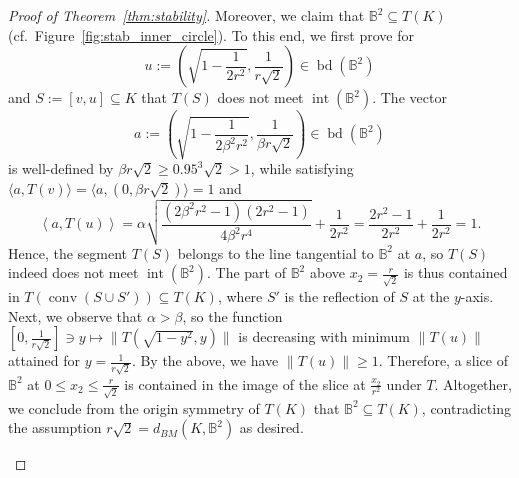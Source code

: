 \documentclass[12pt,a4paper]{article}
\theoremstyle{definition}
\DeclareMathOperator{\conv}{conv}
\DeclareMathOperator{\bd}{bd}
\DeclareMathOperator{\inte}{int}
\newcommand\B{\mathbb{B}}
\begin{document}
\begin{proof}[Proof of Theorem~\ref{thm:stability}]
Moreover, we claim that $\B^2 \subseteq T(K)$ (cf.~Figure~\ref{fig:stab_inner_circle}). To this end, we first prove for
$$ u := \left( \sqrt{1 - \frac{1}{2 r^2}}, \frac{1}{r \sqrt{2}} \right) \in \bd(\B^2) $$
and $S := [v,u] \subseteq K$ that $T(S)$ does not meet $\inte(\B^2)$. The vector
$$ a := \left( \sqrt{1 - \frac{1}{2 \beta^2 r^2}}, \frac{1}{\beta r \sqrt{2}} \right) \in \bd(\B^2) $$
is well-defined by $\beta r \sqrt{2} \geq 0.95^3 \sqrt{2} > 1$, while satisfying $\langle a, T(v) \rangle = \langle a, (0,\beta r \sqrt{2}) \rangle = 1$ and
$$ \left\langle a, T(u) \right\rangle = \alpha \sqrt{\frac{(2 \beta^2 r^2 - 1) (2 r^2 - 1)}{4 \beta^2 r^4}} + \frac{1}{2 r^2} = \frac{2 r^2 - 1}{2 r^2} + \frac{1}{2 r^2} = 1. $$
Hence, the segment $T(S)$ belongs to the line tangential to $\B^2$ at $a$, so $T(S)$ indeed does not meet $\inte(\B^2)$. The part of $\B^2$ above $x_2 = \frac{r}{\sqrt{2}}$ is thus contained in $T(\conv(S \cup S')) \subseteq T(K)$, where $S'$ is the reflection of $S$ at the $y$-axis. Next, we observe that $\alpha > \beta$, so the function $[0,\frac{1}{r \sqrt{2}}] \ni y \mapsto \| T(\sqrt{1-y^2},y) \|$ is decreasing with minimum $\| T(u) \|$ attained for $y = \frac{1}{r \sqrt{2}}$. By the above, we have $\| T(u) \| \geq 1$. Therefore, a slice of $\B^2$ at $0 \leq x_2 \leq \frac{r}{\sqrt{2}}$ is contained in the image of the slice at $\frac{x_2}{r^2}$ under $T$. Altogether, we conclude from the origin symmetry of $T(K)$ that $\B^2 \subseteq T(K)$, contradicting the assumption $r \sqrt{2} = d_{BM}(K,\B^2)$ as desired.



\begin{figure}[ht]
\def\d{1.35}
\def\r{(\d/sqrt(2))}
\def\xr{(sqrt(2)*(2*\r^6-1)/(\r*(\r^6+\r^2-1)))}
\def\a{(\r^2*sqrt((2*\r^2-1)/(2*\r^6-1)))}
\def\b{(\d^2/2)}
\def\sq{(sqrt(2))}
\def\scale{3}
%
\centering
{}
\end{figure}
\end{proof}
\end{document}
